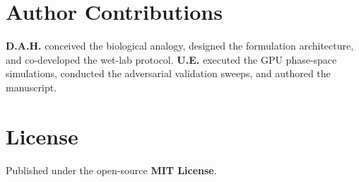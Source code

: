 \documentclass[10pt,twocolumn,letterpaper]{article}
\begin{document}
\section*{Author Contributions}
\textbf{D.A.H.} conceived the biological analogy, designed the formulation architecture, and co-developed the wet-lab protocol. \textbf{U.E.} executed the GPU phase-space simulations, conducted the adversarial validation sweeps, and authored the manuscript.

\section*{License}
Published under the open-source \textbf{MIT License}.
\end{document}
